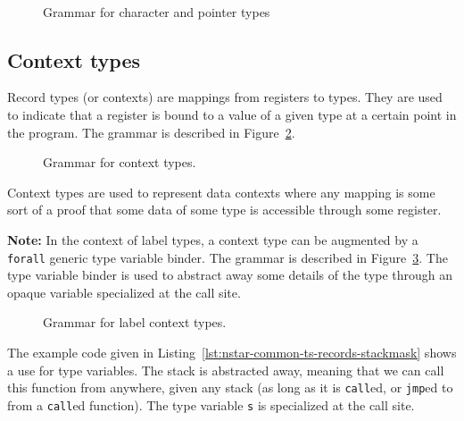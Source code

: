 \begin{figure}[htb]
  \centering
   \\
  \caption{Grammar for character and pointer types}
  \label{fig:nstar-common-ts-atomic-syntax}
\end{figure}

\subsection{Context types}\label{subsec:nstar-common-ts-records}

Record types (or contexts) are mappings from registers to types.
They are used to indicate that a register is bound to a value of a given type at a certain point in the program.
The grammar is described in Figure~\ref{fig:nstar-common-ts-records-syntax}.

\begin{figure}[htb]
  \centering
  \caption{Grammar for context types.}
  \label{fig:nstar-common-ts-records-syntax}
\end{figure}

Context types are used to represent data contexts where any mapping is some sort of a proof that some data of some type is accessible through some register.

\vspace{\baselineskip}

\textbf{Note:} In the context of label types, a context type can be augmented by a \texttt{forall} generic type variable binder.
The grammar is described in Figure~\ref{fig:nstar-common-ts-label-types-syntax}.
The type variable binder is used to abstract away some details of the type through an opaque variable specialized at the call site.

\begin{figure}[htb]
  \centering
  \caption{Grammar for label context types.}
  \label{fig:nstar-common-ts-label-types-syntax}
\end{figure}

The example code given in Listing~\ref{lst:nstar-common-ts-records-stackmask} shows a use for type variables.
The stack is abstracted away, meaning that we can call this function from anywhere, given any stack (as long as it is \texttt{call}ed, or \texttt{jmp}ed to from a \texttt{call}ed function).
The type variable \texttt{s} is specialized at the call site.

